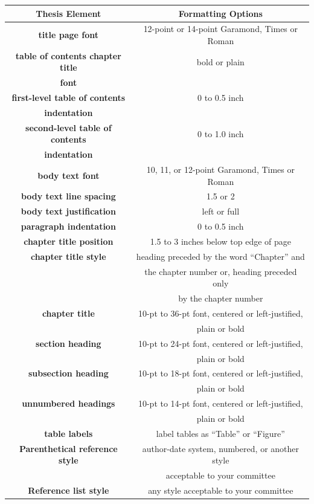 \begin{table}[h]
	\begin{tabular*}{\textwidth}{|c|@{\extracolsep{\fill}}c|}
		\hline
		\textbf{Thesis Element} & \textbf{Formatting Options} \\ \hline
		\textbf{title page font} & \small 12-point or 14-point Garamond, Times or Roman \\ \hline
		\textbf{table of contents chapter title} & \small bold or plain \\
			\textbf{font} & \\ \hline
		\textbf{first-level table of contents} & \small 0 to 0.5 inch \\
			\textbf{indentation} & \\ \hline
		\textbf{second-level table of contents} & \small 0 to 1.0 inch \\
			\textbf{indentation} & \\ \hline
		\textbf{body text font} & \small 10, 11, or 12-point Garamond, Times or Roman \\ \hline
		\textbf{body text line spacing} & \small 1.5 or 2 \\ \hline
		\textbf{body text justification} & \small left or full \\ \hline
		\textbf{paragraph indentation} & \small 0 to 0.5 inch \\ \hline
		\textbf{chapter title position} & \small 1.5 to 3 inches below top edge of page \\ \hline
		\textbf{chapter title style} & \small heading preceded by the word ``Chapter'' and \\
			& \small the chapter number or, heading preceded only \\
			& \small by the chapter number \\ \hline
		\textbf{chapter title} & \small 10-pt to 36-pt font, centered or left-justified, \\
			& \small plain or bold \\ \hline
		\textbf{section heading} & \small 10-pt to 24-pt font, centered or left-justified, \\
			& \small plain or bold \\ \hline
		\textbf{subsection heading} & \small 10-pt to 18-pt font, centered or left-justified, \\
			& \small plain or bold \\ \hline
		\textbf{unnumbered headings} & \small 10-pt to 14-pt font, centered or left-justified, \\
			& \small plain or bold \\ \hline
		\textbf{table labels} & \small label tables as ``Table'' or ``Figure'' \\ \hline
		\textbf{Parenthetical reference style} & \small author-date system, numbered, or another style \\
			& \small acceptable to your committee \\ \hline
		\textbf{Reference list style} & any style acceptable to your committee \\ \hline
	\end{tabular*}
\end{table}

